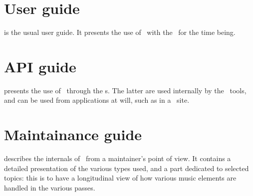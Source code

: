 \section{User guide}

 is the usual user guide. It presents the use of \mf\ with the \CLI\ for the time being.


\section{API guide}

 presents the use of \mf\ through the \API s. The latter are used internally by the \CLI\ tools, and can be used from applications at will, such as in a \Web\ site.


\section{Maintainance guide}

 describes the internals of \mf\ from a maintainer's point of view. It contains a detailed presentation of the various types used, and a part dedicated to selected topics: this is to have a longitudinal view of how various music elements are handled in the various passes.

